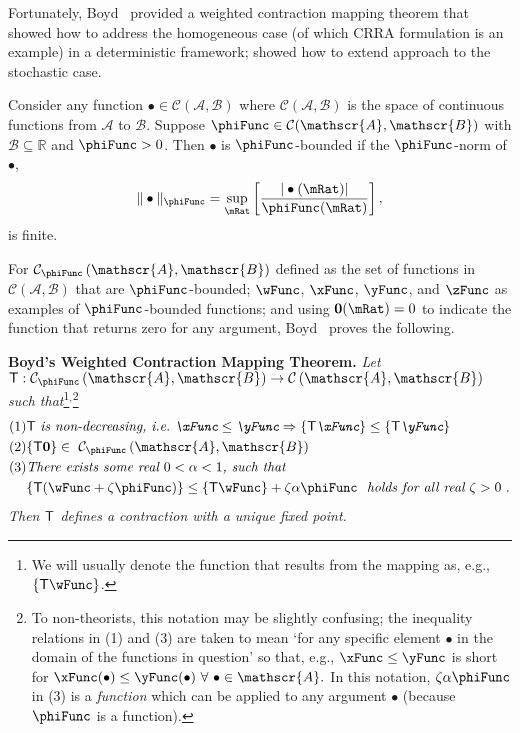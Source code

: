 \documentclass[./BufferStockTheory.tex]{subfiles}
\begin{document}
Fortunately, Boyd~\citeyearpar{jboydWeighted} provided a weighted contraction mapping theorem that \cite{asHomogeneous} showed how to address the homogeneous case (of which CRRA formulation is an example) in a deterministic framework; \cite{duranDiscounting} showed how to extend \cite{jboydWeighted} approach to the stochastic case.
\begin{defn}
Consider any function $\bullet\in \mathcal{C}(\mathscr{A},\mathscr{B})$ where $\mathcal{C}(\mathscr{A},\mathscr{B})$ is the space of continuous functions from $\mathscr{A}$ to $%
\mathscr{B}$. Suppose $\phiFunc \in \mathcal{C}(\mathscr{A},\mathscr{B})$ with $%
\mathscr{B}\subseteq\mathbb{R}$ and $\phiFunc >0$. Then $\bullet$ is $\phiFunc$-bounded if the $\phiFunc$-norm of $\bullet$,
\begin{equation}
\Vert \bullet\Vert _{\phiFunc }=\sup_{\mRat}\left[ \frac{|\bullet(\mRat)|}{\phiFunc (\mRat)}\right] ,
\label{eq:phinorm}
\end{equation}%
is finite.
\end{defn}

For $\mathcal{C}_{\phiFunc }\left( \mathscr{A},\mathscr{B}\right) $
defined as the set of functions in
$\mathcal{C}(\mathscr{A},\mathscr{B})$ that are $\phiFunc$-bounded;
$\wFunc$, $\xFunc$, $\yFunc$, and $\zFunc$ as examples of
$\phiFunc$-bounded functions; and using $\mathbf{0}(\mRat)=0$ to
indicate the function that returns zero for any argument,
Boyd~\citeyearpar{jboydWeighted} proves the following.

\textbf{Boyd's Weighted Contraction Mapping Theorem.} \textit{Let $\BoydT:\mathcal{C}_{\phiFunc }\left( \mathscr{A},\mathscr{B}\right)
\rightarrow \mathcal{C}\left( \mathscr{A},\mathscr{B}\right) $ such
that}\footnote{We will usually denote the function that results from the mapping as, e.g., $\{\BoydT\wFunc\}$.}$^,$\footnote{To non-theorists, this notation may be slightly confusing; the inequality relations in (1) and (3) are taken to mean `for any specific element $\bullet$ in the domain of the functions in question' so that, e.g., $\xFunc \leq \yFunc$ is short for $\xFunc(\bullet) \leq \yFunc(\bullet)~\forall~\bullet\in \mathscr{A}.$  In this notation, $\zeta \Shrinker \phiFunc$ in (3) is a {\it function} which can be applied to any argument $\bullet$ (because $\phiFunc$ is a function).} \nopagebreak
\begin{align*}
\mbox{(1)} &\BoydT%
\mbox{ {\it is non-decreasing, i.e.\ ${\xFunc} \leq {\yFunc}\Rightarrow
\{\BoydT{\xFunc}\} \leq \{\BoydT{\yFunc}\}$}}   \nonumber \\
\mbox{(2)} & \{\BoydT\mathbf{0}\}\in ~ \mathcal{C}_{\phiFunc }\left(\mathscr{A},\mathscr{B}\right)  \notag \\
\mbox{(3)}
& \mbox{\it There exists some real $0 < \Shrinker < 1$, such that} \\
& \{\BoydT({\wFunc} +\zeta\phiFunc )\} \leq \{\BoydT{\wFunc}\} +\zeta\Shrinker \phiFunc
\mbox{ {\it ~holds for all real $\zeta > 0$} }.
\end{align*}%
\textit{Then $\mathsf{T}$ defines a contraction with a unique fixed point.}
\end{document}
